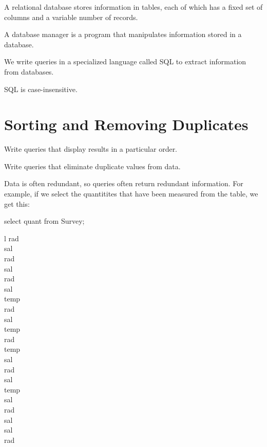 \begin{keypoints}
\begin{swcitemize}
\item
  A relational database stores information in tables, each of which has
  a fixed set of columns and a variable number of records.
\item
  A database manager is a program that manipulates information stored in
  a database.
\item
  We write queries in a specialized language called SQL to extract
  information from databases.
\item
  SQL is case-insensitive.
\end{swcitemize}
\end{keypoints}

\section{Sorting and Removing Duplicates}

\begin{objectives}
\begin{swcitemize}
\item
  Write queries that display results in a particular order.
\item
  Write queries that eliminate duplicate values from data.
\end{swcitemize}
\end{objectives}

Data is often redundant, so queries often return redundant information.
For example, if we select the quantitites that have been measured from
the  table, we get this:

\begin{VerbIn}
select quant from Survey;
\end{VerbIn}

\begin{sqltable}{l}
rad \\
sal \\
rad \\
sal \\
rad \\
sal \\
temp \\
rad \\
sal \\
temp \\
rad \\
temp \\
sal \\
rad \\
sal \\
temp \\
sal \\
rad \\
sal \\
sal \\
rad \\
\end{sqltable}

